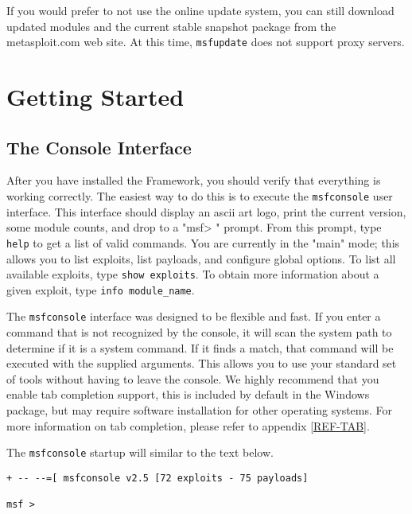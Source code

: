 \documentclass{report}
\begin{document}
\par
If you would prefer to not use the online update system, you can still download
updated modules and the current stable snapshot package from the metasploit.com
web site. At this time, \texttt{msfupdate} does not support proxy servers.
\pagebreak


\chapter{Getting Started}

    \section{The Console Interface}
    \label{STARTED-CONSOLE}
\par
After you have installed the Framework, you should verify that everything is
working correctly.  The easiest way to do this is to execute the
\texttt{msfconsole} user interface. This interface should display an ascii art
logo, print the current version, some module counts, and
drop to a "msf> " prompt. From this prompt, type \texttt{help} to get a list of
valid commands. You are currently in the "main" mode; this allows you to list
exploits, list payloads, and configure global options.  To list all available
exploits, type \texttt{show exploits}. To obtain more information about a given
exploit, type \texttt{info module\_name}. 

\par
The \texttt{msfconsole} interface was designed to be flexible and fast. If you
enter a command that is not recognized by the console, it will scan the system
path to determine if it is a system command. If it finds a match, that
command will be executed with the supplied arguments. This allows you to use
your standard set of tools without having to leave the console. We highly
recommend that you enable tab completion support, this is included by default in
the Windows package, but may require software installation for other operating
systems. For more information on tab completion, please refer to appendix
\ref{REF-TAB}.

\par
The \texttt{msfconsole} startup will similar to the text below.

\begin{verbatim}
+ -- --=[ msfconsole v2.5 [72 exploits - 75 payloads]

msf > 
\end{verbatim}
\end{document}
